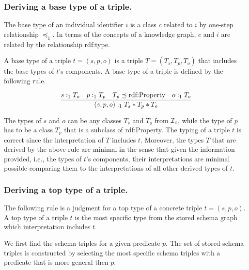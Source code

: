 \documentclass[runningheads]{llncs}
\begin{document}
\subsubsection{Deriving a base type of a triple.}

\noindent The base type of an individual identifier $i$ is a class $c$
related to $i$ by one-step relationship $\preceq_1$. In terms of the
concepts of a knowledge graph, $c$ and $i$ are related by the
relationship rdf:type.

A base type of a triple $t=(s,p,o)$ is a triple $T=(T_s,T_p,T_o)$ that
includes the base types of $t$'s components. A base type of a triple
is defined by the following rule.

\begin{equation}
\dfrac{s:_1T_o\quad p:_1T_p\quad T_p\preceq\/\text{rdf:Property}\quad o:_1T_o}
      {(s,p,o):_1T_s*T_p*T_o}
\end{equation}

The types of $s$ and $o$ can be any classes $T_s$ and $T_o$ from
${\cal I}_c$, while the type of $p$ has to be a class $T_p$ that is a
subclass of rdf:Property. The typing of a triple $t$ is correct since
the interpretation of $T$ includes $t$. Moreover, the types $T$ that
are derived by the above rule are minimal in the sense that given the
information provided, i.e., the types of $t$'s components, their
interpretations are minimal possible comparing them to the
interpretations of all other derived types of $t$.



\subsubsection{Deriving a top type of a triple.}

\noindent The following rule is a judgment for a top type of a
concrete triple $t=(s,p,o)$. A top type of a triple $t$ is the most
specific type from the stored schema graph which interpretation
includes $t$.

We first find the schema triples for a given predicate $p$. The set of
stored schema triples is constructed by selecting the most specific
schema triples with a predicate that is more general then $p$.
\end{document}
